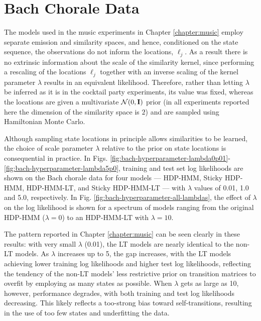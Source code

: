 \section{Bach Chorale Data}

The models used in the music experiments in Chapter \ref{chapter:music}
employ separate emission and similarity spaces, and hence, conditioned
on the state sequence, the observations do not inform the locations,
$\ell_j$.  As a result there is no extrinsic information about the
scale of the similarity kernel, since performing a rescaling of the
locations $\ell_j$ together with an inverse scaling of the kernel
parameter $\lambda$ results in an equivalent likelihood.  Therefore,
rather than letting $\lambda$ be inferred as it is in the cocktail
party experiments, its value was fixed, whereas the locations are
given a multivariate $\mathcal{N}(0,\mathbf{I})$ prior (in all experiments
reported here the dimension of the similarity space is $2$)
and are sampled using Hamiltonian Monte Carlo.

Although sampling state locations in principle allows similarities to be learned,
the choice of scale parameter $\lambda$ relative to the prior on state
locations is consequential in practice.  In
Figs. \ref{fig:bach-hyperparameter-lambda0p01}-\ref{fig:bach-hyperparameter-lambda5p0},
training and test set log likelihoods are shown on the Bach chorale data for four models ---
HDP-HMM, Sticky HDP-HMM, HDP-HMM-LT, and Sticky HDP-HMM-LT --- with
$\lambda$ values of 0.01, 1.0 and 5.0, respectively.  In
Fig. \ref{fig:bach-hyperparameter-all-lambdas}, the effect of
$\lambda$ on the log likelihood is shown for a spectrum of models
ranging from the original HDP-HMM ($\lambda = 0$) to an HDP-HMM-LT
with $\lambda = 10$.

The pattern reported in Chapter \ref{chapter:music} can be seen
clearly in these results: with very small $\lambda$ (0.01), the LT
models are nearly identical to the non-LT models.  As $\lambda$
increases up to 5, the gap increases, with the LT models achieving
lower training log likelihoods and higher test log likelihoods,
reflecting the tendency of the non-LT models' less restrictive prior on transition
matrices to overfit by employing as many states as possible.  When
$\lambda$ gets as large as 10, however, performance degrades, with
both training and test log likelihoods decreasing.  This likely
reflects a too-strong bias toward self-transitions, resulting in the
use of too few states and underfitting the data.

